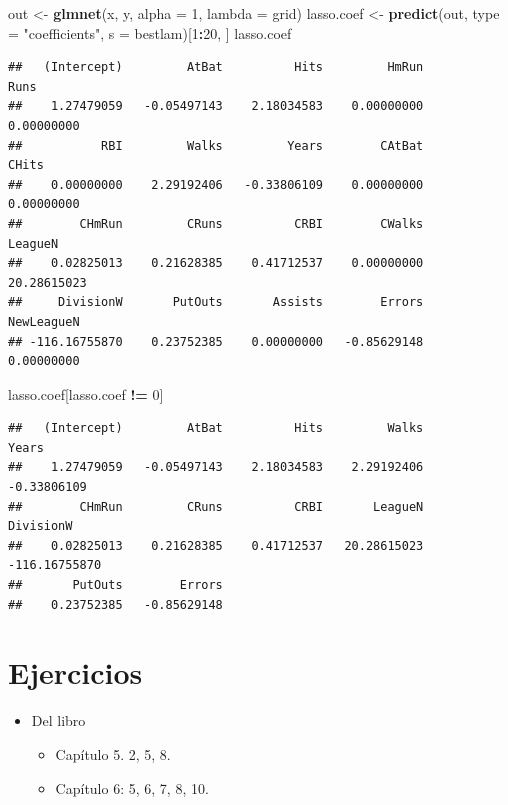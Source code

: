 \documentclass[
  12pt,
]{book}
\newenvironment{Shaded}{\begin{snugshade}}{\end{snugshade}}
\newcommand{\DataTypeTok}[1]{\textcolor[rgb]{0.13,0.29,0.53}{#1}}
\newcommand{\DecValTok}[1]{\textcolor[rgb]{0.00,0.00,0.81}{#1}}
\newcommand{\KeywordTok}[1]{\textcolor[rgb]{0.13,0.29,0.53}{\textbf{#1}}}
\newcommand{\NormalTok}[1]{#1}
\newcommand{\OperatorTok}[1]{\textcolor[rgb]{0.81,0.36,0.00}{\textbf{#1}}}
\newcommand{\StringTok}[1]{\textcolor[rgb]{0.31,0.60,0.02}{#1}}
\providecommand{\tightlist}{%
  \setlength{\itemsep}{0pt}\setlength{\parskip}{0pt}}
\theoremstyle{definition}
\theoremstyle{definition}
\theoremstyle{definition}
\theoremstyle{remark}
\begin{document}
\begin{Shaded}
\begin{Highlighting}[]
\NormalTok{out <-}\StringTok{ }\KeywordTok{glmnet}\NormalTok{(x, y, }\DataTypeTok{alpha =} \DecValTok{1}\NormalTok{, }\DataTypeTok{lambda =}\NormalTok{ grid)}
\NormalTok{lasso.coef <-}\StringTok{ }\KeywordTok{predict}\NormalTok{(out, }\DataTypeTok{type =} \StringTok{"coefficients"}\NormalTok{, }\DataTypeTok{s =}\NormalTok{ bestlam)[}\DecValTok{1}\OperatorTok{:}\DecValTok{20}\NormalTok{, }
\NormalTok{    ]}
\NormalTok{lasso.coef}
\end{Highlighting}
\end{Shaded}

\begin{verbatim}
##   (Intercept)         AtBat          Hits         HmRun          Runs 
##    1.27479059   -0.05497143    2.18034583    0.00000000    0.00000000 
##           RBI         Walks         Years        CAtBat         CHits 
##    0.00000000    2.29192406   -0.33806109    0.00000000    0.00000000 
##        CHmRun         CRuns          CRBI        CWalks       LeagueN 
##    0.02825013    0.21628385    0.41712537    0.00000000   20.28615023 
##     DivisionW       PutOuts       Assists        Errors    NewLeagueN 
## -116.16755870    0.23752385    0.00000000   -0.85629148    0.00000000
\end{verbatim}

\begin{Shaded}
\begin{Highlighting}[]
\NormalTok{lasso.coef[lasso.coef }\OperatorTok{!=}\StringTok{ }\DecValTok{0}\NormalTok{]}
\end{Highlighting}
\end{Shaded}

\begin{verbatim}
##   (Intercept)         AtBat          Hits         Walks         Years 
##    1.27479059   -0.05497143    2.18034583    2.29192406   -0.33806109 
##        CHmRun         CRuns          CRBI       LeagueN     DivisionW 
##    0.02825013    0.21628385    0.41712537   20.28615023 -116.16755870 
##       PutOuts        Errors 
##    0.23752385   -0.85629148
\end{verbatim}

\hypertarget{ejercicios-5}{%
\section{Ejercicios}\label{ejercicios-5}}

\begin{itemize}
\tightlist
\item
  Del libro \autocite{James2013b}

  \begin{itemize}
  \tightlist
  \item
    Capítulo 5. 2, 5, 8.
  \item
    Capítulo 6: 5, 6, 7, 8, 10.
  \end{itemize}
\end{itemize}
\end{document}
